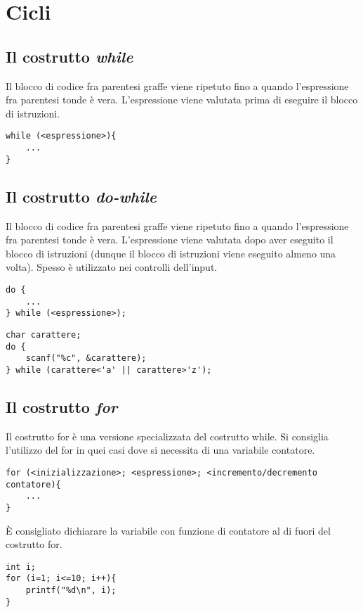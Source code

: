 \section{Cicli}
\subsection{Il costrutto \textit{while}}
Il blocco di codice fra parentesi graffe viene ripetuto fino a quando l'espressione fra parentesi tonde è vera. L'espressione viene valutata prima di eseguire il blocco di istruzioni.
\begin{lstlisting}[title={Struttura del costrutto while}]
while (<espressione>){
    ...
}
\end{lstlisting}

\subsection{Il costrutto \textit{do-while}}
Il blocco di codice fra parentesi graffe viene ripetuto fino a quando l'espressione fra parentesi tonde è vera. L'espressione viene valutata dopo aver eseguito il blocco di istruzioni (dunque il blocco di istruzioni viene eseguito almeno una volta). Spesso è utilizzato nei controlli dell'input.
\begin{lstlisting}[title={Struttura del costrutto do-while}]
do {
    ...
} while (<espressione>);
\end{lstlisting}
\begin{lstlisting}[title={Lettura carattere da tastiera}]
char carattere;
do {
    scanf("%c", &carattere);
} while (carattere<'a' || carattere>'z');
\end{lstlisting}

\subsection{Il costrutto \textit{for}}
Il costrutto \colorbox{light-gray}{for} è una versione specializzata del costrutto while. Si consiglia l'utilizzo del for in quei casi dove si necessita di una variabile contatore.
\begin{lstlisting}[title={Struttura del costrutto for}]
for (<inizializzazione>; <espressione>; <incremento/decremento contatore){
    ...
}
\end{lstlisting}
\`{E} consigliato dichiarare la variabile con funzione di contatore al di fuori del costrutto \colorbox{light-gray}{for}.
\begin{lstlisting}[title={Stampa i numeri da 1 a 10}]
int i;
for (i=1; i<=10; i++){
    printf("%d\n", i);
}
\end{lstlisting}

